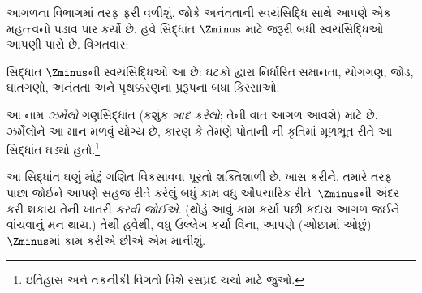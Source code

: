 \documentclass[../../../include/open-logic-section]{subfiles}
\begin{document}

આગળના વિભાગમાં \stagesinf{} તરફ ફરી વળીશું. જોકે અનંતતાની
સ્વયંસિદ્ધિ સાથે આપણે એક મહત્ત્વનો પડાવ પાર કર્યો છે. હવે સિદ્ધાંત
$\Zminus$ માટે જરૂરી બધી સ્વયંસિદ્ધિઓ આપણી પાસે છે. વિગતવાર:

\begin{defn}
સિદ્ધાંત $\Zminus$ની સ્વયંસિદ્ધિઓ આ છે: ઘટકો દ્વારા નિર્ધારિત
સમાનતા, યોગગણ, જોડ, ઘાતગણો, અનંતતા અને પૃથક્કરણના પ્રરૂપના
બધા કિસ્સાઓ.
\end{defn}

આ નામ \emph{ઝર્મેલો} ગણસિદ્ધાંત (કશુંક \emph{બાદ કરેલો};
તેની વાત આગળ આવશે) માટે છે. ઝર્મેલોને આ માન મળવું યોગ્ય છે,
કારણ કે તેમણે પોતાની \citeyear{Zermelo1908Untersuchungen}ની
કૃતિમાં મૂળભૂત રીતે આ સિદ્ધાંત ઘડ્યો હતો.\footnote{ઇતિહાસ અને
તકનીકી વિગતો વિશે રસપ્રદ ચર્ચા માટે \citet[Appendix
A]{Potter2004} જુઓ.}

આ સિદ્ધાંત ઘણું મોટું ગણિત વિકસાવવા પૂરતો શક્તિશાળી છે.
ખાસ કરીને, તમારે  તરફ પાછા જોઈને આપણે
સહજ રીતે કરેલું બધું કામ વધુ ઔપચારિક રીતે~$\Zminus$ની અંદર
કરી શકાય તેની ખાતરી \emph{કરવી જોઈએ}. (થોડું આવું કામ કર્યા
પછી કદાચ આગળ જઈને  વાંચવાનું
મન થાય.) તેથી હવેથી, વધુ ઉલ્લેખ કર્યા વિના, આપણે (ઓછામાં ઓછું)
$\Zminus$માં કામ કરીએ છીએ એમ માનીશું.
\end{document}
